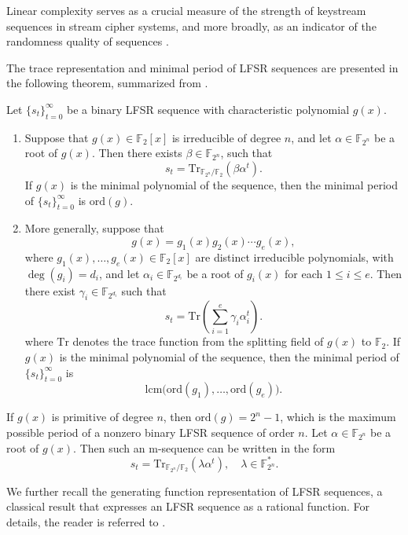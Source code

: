 \documentclass[hidelinks,onefignum,onetabnum]{siamart251216}
\theoremstyle{definition}
\theoremstyle{remark}
\providecommand{\ord}{{\mathrm{ord}}}
\providecommand{\Tr}{{\mathrm{Tr}}}
\begin{document}
Linear complexity serves as a crucial measure of the strength of keystream sequences in stream cipher systems, and more broadly, as an indicator of the randomness quality of sequences \cite{Ding 1997 linear complexity}.

The trace representation and minimal period of LFSR sequences are presented in the following theorem, summarized from \cite{Golomb 1967, Goresky 2012}.

\begin{theorem}\label{thm:lfsr-trace}
	Let $\{s_t\}_{t=0}^\infty$ be a binary LFSR sequence with characteristic polynomial $g(x)$.
	
	\begin{enumerate}
		\item Suppose that $g(x)\in \mathbb F_2[x]$ is irreducible of degree $n$, and let $\alpha\in \mathbb F_{2^n}$ be a root of $g(x)$. Then there exists $\beta\in \mathbb F_{2^n}$, such that
		\[
		s_t=\Tr_{\mathbb F_{2^n}/\mathbb F_2}(\beta\alpha^t).
		\]
		If $g(x)$ is the minimal polynomial of the sequence, then the minimal period of $\{s_t\}_{t=0}^\infty$ is $\ord(g)$.
		
		\item More generally, suppose that
		\[
		g(x)=g_1(x)g_2(x)\cdots g_e(x),
		\]
		where $g_1(x),\dots,g_e(x)\in \mathbb F_2[x]$ are distinct irreducible polynomials, with $\deg(g_i)=d_i$, and let $\alpha_i\in \mathbb F_{2^{d_i}}$ be a root of $g_i(x)$ for each $1\le i\le e$. Then there exist $\gamma_i\in \mathbb F_{2^{d_i}}$ such that
		\[
		s_t=\Tr\!\left(\sum_{i=1}^e \gamma_i\alpha_i^t\right).
		\]
		where $\Tr$ denotes the trace function from the splitting field of $g(x)$ to $\mathbb F_2$. If $g(x)$ is the minimal polynomial of the sequence, then the minimal period of $\{s_t\}_{t=0}^\infty$ is
		\[
		\mathrm{lcm}\bigl(\ord(g_1),\dots,\ord(g_e)\bigr).
		\]
	\end{enumerate}
\end{theorem}

 If $g(x)$ is primitive of degree $n$, then $\ord(g)=2^n-1$, which is the maximum possible period of a nonzero binary LFSR sequence of order $n$. Let $\alpha\in \mathbb F_{2^n}$ be a root of $g(x)$. Then such an m-sequence can be written in the form
\begin{equation}\label{eq:msequence-trace}
	s_t=\Tr_{\mathbb F_{2^n}/\mathbb F_2}(\lambda\alpha^t),\quad \lambda\in \mathbb F_{2^n}^*.
\end{equation}

We further recall the generating function representation of LFSR sequences,
a classical result that expresses an LFSR sequence as a rational function. For details, the reader is referred to \cite{Goresky 2012}.
\end{document}
